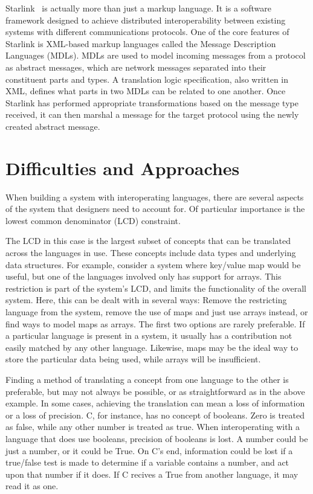 \documentclass{sig-alternate}
\begin{document}
Starlink~\cite{Bromberg:2011} is actually more than just a markup language. It is a software framework designed to achieve distributed interoperability between existing systems with different communications protocols. One of the core features of Starlink is XML-based markup languages called the Message Description Languages (MDLs). MDLs are used to model incoming messages from a protocol as abstract messages, which are network messages separated into their constituent parts and types. A translation logic specification, also written in XML, defines what parts in two MDLs can be related to one another. Once Starlink has performed appropriate transformations based on the message type received, it can then marshal a message for the target protocol using the newly created abstract message.

\section{Difficulties and Approaches}\label{approaches}
When building a system with interoperating languages, there are several aspects of the system that designers need to account for. Of particular importance is the lowest common denominator (LCD) constraint.

The LCD in this case is the largest subset of concepts that can be translated across the languages in use. These concepts include data types and underlying data structures.
For example, consider a system where key/value map would be useful, but one of the languages involved only has support for arrays. This restriction is part of the system's LCD, and limits the functionality of the overall system. Here, this can be dealt with in several ways: Remove the restricting language from the system, remove the use of maps and just use arrays instead, or find ways to model maps as arrays. The first two options are rarely preferable. If a particular language is present in a system, it usually has a contribution not easily matched by any other language. Likewise, maps may be the ideal way to store the particular data being used, while arrays will be insufficient.

Finding a method of translating a concept from one language to the other is preferable, but may not always be possible, or as straightforward as in the above example. In some cases, achieving the translation can mean a loss of information or a loss of precision. C, for instance, has no concept of booleans. Zero is treated as false, while any other number is treated as true. When interoperating with a language that does use booleans, precision of booleans is lost. A number could be just a number, or it could be True. On C's end, information could be lost if a true/false test is made to determine if a variable contains a number, and act upon that number if it does. If C recives a True from another language, it may read it as one.
\end{document}
